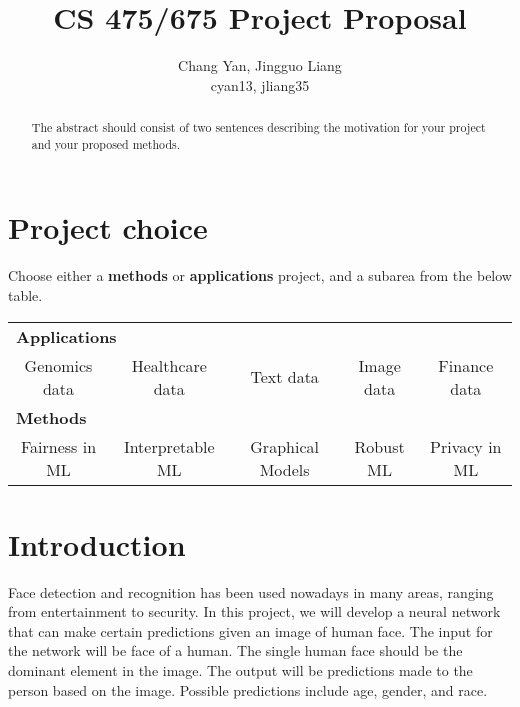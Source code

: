 \documentclass{article}
\title{CS 475/675 Project Proposal}
\author{
  Chang Yan, Jingguo Liang\\
  cyan13, jliang35
}
\newcommand{\Checked}{{\LARGE \XBox}}%
\newcommand{\Unchecked}{{\LARGE \Square}}%
\begin{document}
\maketitle

\begin{abstract}
The abstract should consist of two sentences describing the motivation for your project and your proposed methods.
\end{abstract}

\section{Project choice}

Choose either a {\bf methods} or {\bf applications} project, and a subarea from the below table.
\begin{table}[!h]
\centering
\def\arraystretch{2}
\begin{tabular}{c c c c c }
\toprule
\multicolumn{5}{l}{\Checked \bf Applications} \\
\Unchecked Genomics data & 
\Unchecked Healthcare data & 
\Unchecked Text data &
\Checked Image data &
\Unchecked Finance data \\
\midrule
\multicolumn{5}{l}{\Unchecked \bf Methods} \\
\Unchecked Fairness in ML &
\Unchecked Interpretable ML &
\Unchecked Graphical Models &
\Unchecked Robust ML &
\Unchecked Privacy in ML \\
\bottomrule
\end{tabular}
\end{table}

\section{Introduction}	
Face detection and recognition has been used nowadays in many areas, ranging from entertainment to security. In this project, we will develop a neural network that can make certain predictions given an image of human face. The input for the network will be face of a human. The single human face should be the dominant element in the image. The output will be predictions made to the person based on the image. Possible predictions include age, gender, and race.
\end{document}
